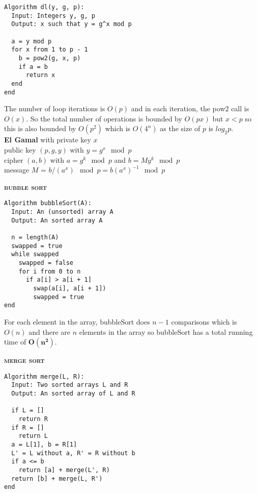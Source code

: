 \documentclass[a4paper]{article}
\begin{document}
\begin{multicols}{2}
\begin{framed}
\begin{lstlisting}
Algorithm dl(y, g, p):
  Input: Integers y, g, p
  Output: x such that y = g^x mod p
	
  a = y mod p	
  for x from 1 to p - 1
    b = pow2(g, x, p)
    if a = b
      return x
  end
end
\end{lstlisting}

\noindent
The number of loop iterations is $O(p)$ and in each iteration, the pow2 call is $O(x)$. So the total number of operations is bounded by $O(px)$ but $x < p$ so this is also bounded by $O(p^2)$ which is $O(4^n)$ as the size of $p$ is $log_2p$.\\

\noindent
\textbf{El Gamal} with private key $x$\\ 
public key $(p, g, y)$ with $y = g^x \mod p$\\
cipher $(a, b)$ with $a = g^k \mod p$ and $b = My^k \mod p$\\
message $M$ = $b/(a^x) \mod p = b(a^x)^{-1} \mod p$
\end{framed}

\newpage

\begin{framed}
\begin{center}
	\textbf{\textsc{bubble sort}}
\end{center}
\begin{lstlisting}
Algorithm bubbleSort(A):
  Input: An (unsorted) array A
  Output: An sorted array A
  
  n = length(A)
  swapped = true
  while swapped
    swapped = false
    for i from 0 to n
      if a[i] > a[i + 1]
      	swap(a[i], a[i + 1])
      	swapped = true
end
\end{lstlisting}

\noindent
For each element in the array, bubbleSort does $n - 1$ comparisons which is $O(n)$ and there are $n$ elements in the array so bubbleSort has a total running time of $\bm{O(n^2)}$.
\end{framed}

\begin{framed}
\begin{center}
	\textbf{\textsc{merge sort}}
\end{center}
\begin{lstlisting}
Algorithm merge(L, R):
  Input: Two sorted arrays L and R
  Output: An sorted array of L and R
  
  if L = []
    return R
  if R = []
    return L
  a = L[1], b = R[1]
  L' = L without a, R' = R without b
  if a <= b
    return [a] + merge(L', R)
  return [b] + merge(L, R')
end
\end{lstlisting}


\end{framed}
\end{multicols}
\end{document}
